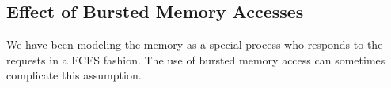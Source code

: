 \subsection{Effect of Bursted Memory Accesses}
We have been modeling the memory as a special process who responds to the requests in a FCFS fashion. The use of bursted memory access can sometimes complicate this
assumption.

























